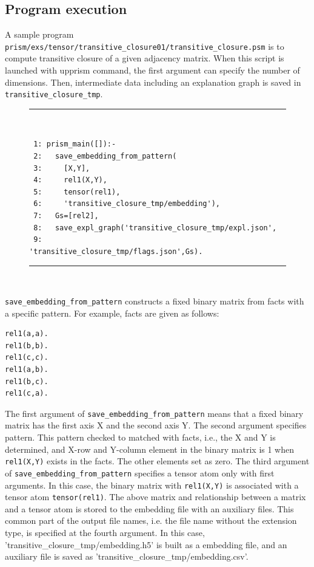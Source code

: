\documentclass[a4paper]{report}
\begin{document}
\subsection*{Program execution}

A sample program {\tt prism/exs/tensor/transitive\_closure01/transitive\_closure.psm} is to compute transitive closure of a given adjacency matrix.
When this script is launched with upprism command, the first argument can specify the  number of dimensions.
Then, intermediate data including an explanation graph is saved in {\tt transitive\_closure\_tmp}.

\begin{figure}[h]
	\rule{0.85\textwidth}{0.10mm}\\ [-1em]
	\begin{verbatim}
 1: prism_main([]):- 
 2:   save_embedding_from_pattern(
 3:     [X,Y],
 4:     rel1(X,Y),
 5:     tensor(rel1),
 6:     'transitive_closure_tmp/embedding'),
 7:   Gs=[rel2],
 8:   save_expl_graph('transitive_closure_tmp/expl.json',
 9:                   'transitive_closure_tmp/flags.json',Gs).
	\end{verbatim}
	\rule{0.85\textwidth}{0.10mm}\\ [-1em]
\end{figure}



{\tt save\_embedding\_from\_pattern}
constructs a fixed binary matrix from facts with a specific pattern.
For example, facts are given as follows:
\begin{verbatim}
rel1(a,a).
rel1(b,b).
rel1(c,c).
rel1(a,b).
rel1(b,c).
rel1(c,a).
\end{verbatim}

The first argument of {\tt save\_embedding\_from\_pattern} means that a fixed binary matrix has the first axis X and the second axis Y.
The second argument specifies pattern.
This pattern checked to matched with facts, i.e., the X and Y is determined, and 
X-row and Y-column element in the binary matrix is 1 when {\tt rel1(X,Y)} exists in the facts.
The other elements set as zero. 
The third argument of {\tt save\_embedding\_from\_pattern} specifies a tensor atom only with first arguments. In this case, the binary matrix with {\tt rel1(X,Y)} is associated with a tensor atom {\tt tensor(rel1)}.
The above matrix and relationship between a matrix and a tensor atom is stored to the embedding file with an auxiliary files.
This common part of the output file names, i.e. the file name without  the extension type, is specified at the fourth argument.
In this case, 'transitive\_closure\_tmp/embedding.h5' is built as a embedding file, and an auxiliary file is saved as 'transitive\_closure\_tmp/embedding.csv'.
\end{document}
